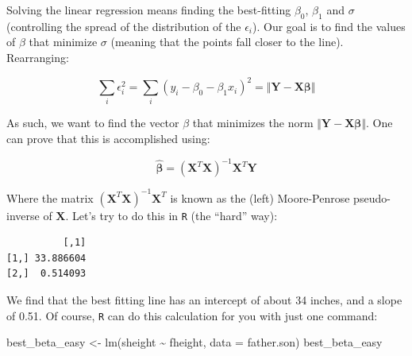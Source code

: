 \documentclass[
  letterpaper,
  DIV=11,
  numbers=noendperiod]{scrreprt}
\newenvironment{Shaded}{\begin{snugshade}}{\end{snugshade}}
\newcommand{\AttributeTok}[1]{\textcolor[rgb]{0.40,0.45,0.13}{#1}}
\newcommand{\DecValTok}[1]{\textcolor[rgb]{0.68,0.00,0.00}{#1}}
\newcommand{\FunctionTok}[1]{\textcolor[rgb]{0.28,0.35,0.67}{#1}}
\newcommand{\NormalTok}[1]{\textcolor[rgb]{0.00,0.23,0.31}{#1}}
\newcommand{\OtherTok}[1]{\textcolor[rgb]{0.00,0.23,0.31}{#1}}
\newcommand{\SpecialCharTok}[1]{\textcolor[rgb]{0.37,0.37,0.37}{#1}}
\begin{document}
Solving the linear regression means finding the best-fitting
\(\beta_0\), \(\beta_1\) and \(\sigma\) (controlling the spread of the
distribution of the \(\epsilon_i\)). Our goal is to find the values of
\(\beta\) that minimize \(\sigma\) (meaning that the points fall closer
to the line). Rearranging:

\[
\sum_i \epsilon_i^2 = \sum_i (y_i - \beta_0 - \beta_1 x_i)^2 =  \Vert \mathbf{Y} - \mathbf{X} \mathbf{\beta} \Vert
\]

As such, we want to find the vector \(\beta\) that minimizes the norm
\(\Vert \mathbf{Y} - \mathbf{X} \mathbf{\beta} \Vert\). One can prove
that this is accomplished using:

\[
\hat{\mathbf{\beta}} = \left( \mathbf{X}^T \mathbf{X} \right)^{-1} \mathbf{X}^T \mathbf{Y}
\]

Where the matrix
\(\left( \mathbf{X}^T \mathbf{X} \right)^{-1} \mathbf{X}^T\) is known as
the (left) Moore-Penrose pseudo-inverse of \(\mathbf{X}\). Let's try to
do this in \texttt{R} (the ``hard'' way):

\begin{Shaded}
\end{Shaded}

\begin{verbatim}
          [,1]
[1,] 33.886604
[2,]  0.514093
\end{verbatim}

We find that the best fitting line has an intercept of about 34 inches,
and a slope of 0.51. Of course, \texttt{R} can do this calculation for
you with just one command:

\begin{Shaded}
\begin{Highlighting}[]
\NormalTok{best\_beta\_easy }\OtherTok{\textless{}{-}} \FunctionTok{lm}\NormalTok{(sheight }\SpecialCharTok{\textasciitilde{}}\NormalTok{ fheight, }\AttributeTok{data =}\NormalTok{ father.son)}
\NormalTok{best\_beta\_easy}
\end{Highlighting}
\end{Shaded}
\end{document}
